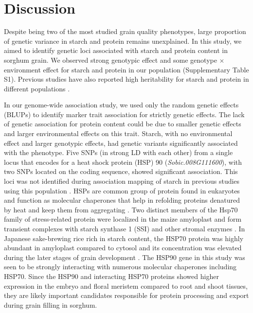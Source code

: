 \documentclass[10pt,letterpaper]{article}
\begin{document}
\section*{Discussion}
Despite being two of the most studied grain quality phenotypes, large proportion of genetic variance in starch and protein remains unexplained. In this study, we aimed to identify genetic loci associated with starch and protein content in sorghum grain. We observed strong genotypic effect and some genotype $\times$ environment effect for starch and protein in our population (Supplementary Table S1). Previous studies have also reported high heritability for starch and protein in different populations \parencite{rami1998quantitative,murray2008genetic,rhodes2017genetic}.

In our genome-wide association study, we used only the random genetic effects (BLUPs) to identify marker trait association for strictly genetic effects. The lack of genetic association for protein content could be due to smaller genetic effects and larger environmental effects on this trait. Starch, with no environmental effect and larger genotypic effects, had genetic variants significantly associated with the phenotype. Five SNPs (in strong LD with each other) from a single locus that encodes for a heat shock protein (HSP) 90 (\textit{Sobic.008G111600}), with two SNPs located on the coding sequence, showed significant association. This loci was not identified during association mapping of starch in previous studies using this population \parencite{rhodes2017genetic,boyles2017genetic}. HSPs are common group of protein found in eukaryotes and function as molecular chaperones that help in refolding proteins denatured by heat and keep them from aggregating \parencite{vierling1991roles,boston1996molecular}. Two distinct members of the Hsp70 family of stress-related protein were localized in the maize amyloplast and form transient complexes with starch synthase 1 (SSI) and other stromal enzymes \parencite{yu1998polypeptides}. In Japanese sake-brewing rice rich in starch content, the HSP70 protein was highly abundant in amyloplast compared to cytosol and its concentration was elevated during the later stages of grain development \parencite{kamara2009japanese}. The HSP90 gene in this study was seen to be strongly interacting with numerous molecular chaperones including HSP70. Since the HSP90 and interacting HSP70 proteins showed higher expression in the embryo and floral meristem compared to root and shoot tissues, they are likely important candidates responsible for protein processing and export during grain filling in sorghum.
\end{document}
